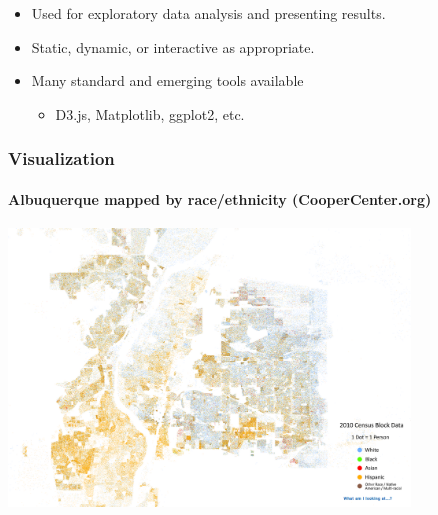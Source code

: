\begin{frame}
\begin{center}
\bigskip

\begin{itemize}
\item Used for exploratory data analysis and presenting results.
\item Static, dynamic, or interactive as appropriate.
\item Many standard and emerging tools available
\begin{itemize}
\item D3.js, Matplotlib, ggplot2, etc.
\end{itemize}
\end{itemize}

\end{center}

\end{frame}


\begin{frame}
\frametitle{Visualization}
\framesubtitle{Albuquerque mapped by race/ethnicity (CooperCenter.org)}

\begin{center}

\includegraphics[width=0.8\textwidth]{graphics/racial_dot_map-ABQ1.png}


\end{center}

\end{frame}

